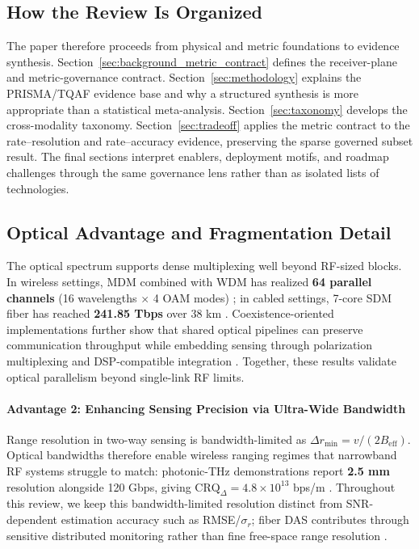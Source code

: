 \documentclass[letterpaper,journal]{IEEEtran}
\begin{document}
\subsection{How the Review Is Organized}

The paper therefore proceeds from physical and metric foundations to evidence synthesis. Section~\ref{sec:background_metric_contract} defines the receiver-plane and metric-governance contract. Section~\ref{sec:methodology} explains the PRISMA/TQAF evidence base and why a structured synthesis is more appropriate than a statistical meta-analysis. Section~\ref{sec:taxonomy} develops the cross-modality taxonomy. Section~\ref{sec:tradeoff} applies the metric contract to the rate--resolution and rate--accuracy evidence, preserving the sparse governed subset result. The final sections interpret enablers, deployment motifs, and roadmap challenges through the same governance lens rather than as isolated lists of technologies.

\subsection{Optical Advantage and Fragmentation Detail}

The optical spectrum supports dense multiplexing well beyond RF-sized blocks. In wireless settings, MDM combined with WDM has realized \textbf{64 parallel channels} (16 wavelengths $\times$ 4 OAM modes) ; in cabled settings, 7-core SDM fiber has reached \textbf{241.85 Tbps} over 38 km . Coexistence-oriented implementations further show that shared optical pipelines can preserve communication throughput while embedding sensing through polarization multiplexing and DSP-compatible integration . Together, these results validate optical parallelism beyond single-link RF limits.

\paragraph{Advantage 2: Enhancing Sensing Precision via Ultra-Wide Bandwidth}
Range resolution in two-way sensing is bandwidth-limited as $\Delta r_{\min} = v/(2B_{\text{eff}})$. Optical bandwidths therefore enable wireless ranging regimes that narrowband RF systems struggle to match: photonic-THz demonstrations report \textbf{2.5 mm} resolution alongside 120 Gbps, giving $\text{CRQ}_{\Delta} = 4.8\times10^{13}$ bps/m . Throughout this review, we keep this bandwidth-limited resolution distinct from SNR-dependent estimation accuracy such as RMSE/$\sigma_r$; fiber DAS contributes through sensitive distributed monitoring rather than fine free-space range resolution .
\end{document}
